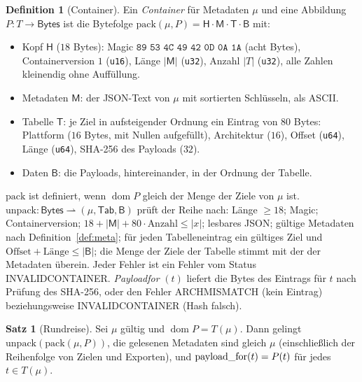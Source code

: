 \documentclass[a4paper,12pt,twoside]{report}
\DeclareRobustCommand{\_}{\ifmmode\mbox{\textunderscore}\else\textunderscore\allowbreak{}\fi}
\theoremstyle{definition}
\newtheorem{definition}{Definition}[chapter]
\newtheorem{satz}{Satz}[chapter]
\newcommand{\Bytes}{\mathsf{Bytes}}
\newcommand{\dom}{\operatorname{dom}}
\begin{document}
\begin{definition}[Container]
	\label{def:container}
	Ein \emph{Container} für Metadaten $\mu$ und eine Abbildung $P:T\to\Bytes$ ist die Bytefolge $\mathrm{pack}(\mu,P)=\mathsf H\cdot\mathsf M\cdot\mathsf T\cdot\mathsf B$ mit:
	\begin{itemize}
		\item Kopf $\mathsf H$ ($18$ Bytes): Magic $\texttt{89 53 4C 49 42 0D 0A 1A}$ (acht Bytes), Containerversion $1$ (\texttt{u16}), Länge $|\mathsf M|$ (\texttt{u32}), Anzahl $|T|$ (\texttt{u32}), alle Zahlen kleinendig ohne Auffüllung.
		\item Metadaten $\mathsf M$: der JSON-Text von $\mu$ \cite{rfc8259} mit sortierten Schlüsseln, als ASCII.
		\item Tabelle $\mathsf T$: je Ziel in aufsteigender Ordnung ein Eintrag von $80$ Bytes: Plattform ($16$ Bytes, mit Nullen aufgefüllt), Architektur ($16$), Offset (\texttt{u64}), Länge (\texttt{u64}), SHA-256 des Payloads ($32$).
		\item Daten $\mathsf B$: die Payloads, hintereinander, in der Ordnung der Tabelle.
	\end{itemize}
	$\mathrm{pack}$ ist definiert, wenn $\dom P$ gleich der Menge der Ziele von $\mu$ ist. $\mathrm{unpack}:\Bytes\rightharpoonup(\mu,\mathsf{Tab},\mathsf B)$ prüft der Reihe nach: Länge $\ge18$; Magic; Containerversion; $18+|\mathsf M|+80\cdot\text{Anzahl}\le|x|$; lesbares JSON; gültige Metadaten nach Definition~\ref{def:meta}; für jeden Tabelleneintrag ein gültiges Ziel und $\text{Offset}+\text{Länge}\le|\mathsf B|$; die Menge der Ziele der Tabelle stimmt mit der der Metadaten überein. Jeder Fehler ist ein Fehler vom Status INVALID\_CONTAINER. \emph{Payload\_for} $(t)$ liefert die Bytes des Eintrags für $t$ nach Prüfung des SHA-256, oder den Fehler ARCH\_MISMATCH (kein Eintrag) beziehungsweise INVALID\_CONTAINER (Hash falsch).
\end{definition}

\begin{satz}[Rundreise]
	\label{satz:rundreise}
	Sei $\mu$ gültig und $\dom P=T(\mu)$. Dann gelingt $\mathrm{unpack}(\mathrm{pack}(\mu,P))$, die gelesenen Metadaten sind gleich $\mu$ (einschließlich der Reihenfolge von Zielen und Exporten), und $\mathrm{payload\_for}(t)=P(t)$ für jedes $t\in T(\mu)$.
\end{satz}
\end{document}
